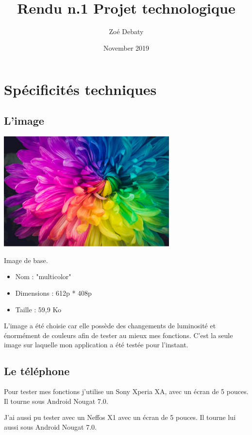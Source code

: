 \documentclass{article}
\title{Rendu n.1 Projet technologique}
\author{Zoé Debaty}
\date{November 2019}
\begin{document}
\maketitle
\tableofcontents 
\newpage

\section{Spécificités techniques}

\subsection{L'image}
\begin{center} 
    \includegraphics[width=9cm]{../multicolor}
    
    Image de base.
\end{center}
\bigbreak

\begin{itemize}
\item Nom : "multicolor"
\item Dimensions : 612p * 408p
\item Taille : 59,9 Ko
\end{itemize}
\medbreak

L'image a été choisie car elle possède des changements de luminosité et énormément de couleurs afin de tester au mieux mes fonctions.
C'est la seule image sur laquelle mon application a été testée pour l'instant.

\subsection{Le téléphone}
Pour tester mes fonctions j'utilise un Sony Xperia XA, avec un écran de 5 pouces.
Il tourne sous Android Nougat 7.0.
\medbreak

J'ai aussi pu tester avec un Neffos X1 avec un écran de 5 pouces.
Il tourne lui aussi sous Android Nougat 7.0.
\newpage
\end{document}
